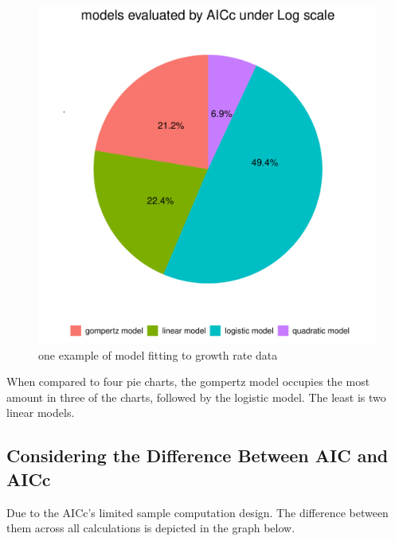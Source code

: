\documentclass[11pt]{article}
\begin{document}
\begin{figure}[H]
    \centering
    \includegraphics[scale=0.3]{AICc_Log.pdf}
    \caption{one example of model fitting to growth rate data}
    \label{fig.5}
\end{figure}

When compared to four pie charts, the gompertz model occupies the most amount in three of the charts, followed by the logistic model. The least is two linear models.
\subsection{Considering the Difference Between AIC and AICc}
Due to the AICc's limited sample computation design. The difference between them across all calculations is depicted in the graph below.
\end{document}
